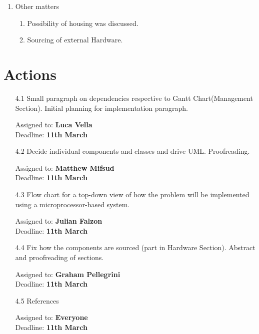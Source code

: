 \documentclass{cce2014-meetings}
\begin{document}
\begin{enumerate}

\item Other matters
   \begin{enumerate}
   \item Possibility of housing was discussed.
   \item Sourcing of external Hardware.
   \end{enumerate}

\end{enumerate}

\section*{Actions}

\begin{enumerate}

\item [4.1] Small paragraph on dependencies respective to Gantt Chart(Management Section). Initial planning for implementation paragraph.
\begin{flushright}
Assigned to: \textbf{Luca Vella} \\
Deadline: \textbf{11th March}
\end{flushright}

\item [4.2] Decide individual components and classes and drive UML. Proofreading.
\begin{flushright}
Assigned to: \textbf{Matthew Mifsud} \\
Deadline: \textbf{11th March}
\end{flushright}

\item [4.3] Flow chart for a top-down view of how the problem will be implemented using a microprocessor-based system.
\begin{flushright}
Assigned to: \textbf{Julian Falzon} \\
Deadline: \textbf{11th March}
\end{flushright}

\item [4.4] Fix how the components are sourced (part in Hardware Section). Abstract and proofreading of sections.
\begin{flushright}
Assigned to: \textbf{Graham Pellegrini} \\
Deadline: \textbf{11th March}
\end{flushright}

\item [4.5] References 
\begin{flushright}
Assigned to: \textbf{Everyone} \\
Deadline: \textbf{11th March}
\end{flushright}



\end{enumerate}
\end{document}
